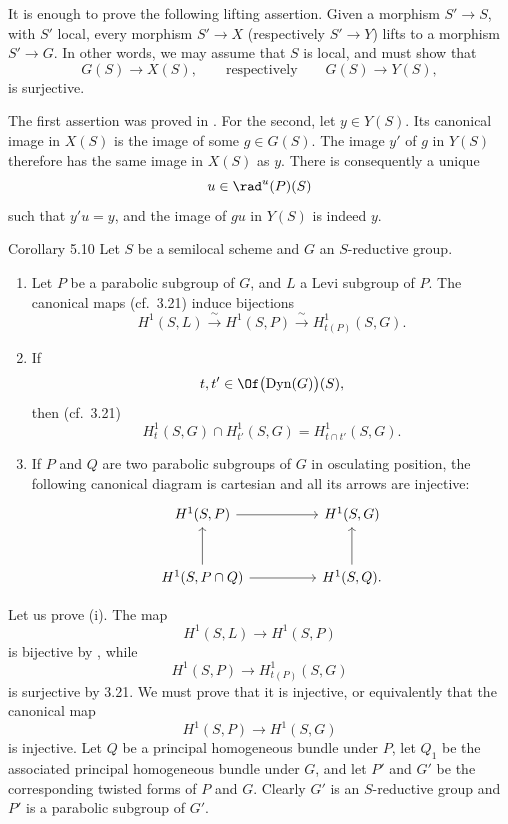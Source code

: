 It is enough to prove the following lifting assertion.  Given a
morphism \(S'\to S\), with \(S'\) local, every morphism \(S'\to X\)
\textup{(respectively \(S'\to Y\))} lifts to a morphism \(S'\to G\).
In other words, we may assume that \(S\) is local, and must show that
\[
 G(S)\longrightarrow X(S),
 \qquad\text{respectively}\qquad
 G(S)\longrightarrow Y(S),
\]
is surjective.

The first assertion was proved in .  For the second, let
\(y\in Y(S)\).  Its canonical image in \(X(S)\) is the image of some
\(g\in G(S)\).  The image \(y'\) of \(g\) in \(Y(S)\) therefore has
the same image in \(X(S)\) as \(y\).  There is consequently a unique
\[
 u\in\rad^u(P)(S)
\]
such that \(y'u=y\), and the image of \(gu\) in \(Y(S)\) is indeed
\(y\).

\begin{sgastatement}{Corollary 5.10}
Let \(S\) be a semilocal scheme and \(G\) an \(S\)-reductive group.
\begin{enumerate}[label=\textup{(\roman*)}]
\item Let \(P\) be a parabolic subgroup of \(G\), and \(L\) a Levi
subgroup of \(P\).  The canonical maps \textup{(cf.\ 3.21)}
induce bijections
\[
 H^1(S,L)\xrightarrow{\ \sim\ }H^1(S,P)
       \xrightarrow{\ \sim\ }H^1_{t(P)}(S,G).
\]
\item If
\[
 t,t'\in\Of\bigl(\operatorname{Dyn}(G)\bigr)(S),
\]
then \textup{(cf.\ 3.21)}
\[
 H^1_t(S,G)\cap H^1_{t'}(S,G)=H^1_{t\cap t'}(S,G).
\]
\item If \(P\) and \(Q\) are two parabolic subgroups of \(G\) in
osculating position, the following canonical diagram is cartesian
and all its arrows are injective:
\[
\begin{tikzcd}[column sep=huge,row sep=large]
 H^1(S,P) \arrow[r] & H^1(S,G)\\
 H^1(S,P\cap Q) \arrow[u] \arrow[r] & H^1(S,Q). \arrow[u]
\end{tikzcd}
\]
\end{enumerate}
\end{sgastatement}

Let us prove \textup{(i)}.  The map
\[
 H^1(S,L)\longrightarrow H^1(S,P)
\]
is bijective by , while
\[
 H^1(S,P)\longrightarrow H^1_{t(P)}(S,G)
\]
is surjective by 3.21.  We must prove that it is injective, or
equivalently that the canonical map
\[
 H^1(S,P)\longrightarrow H^1(S,G)
\]
is injective.  Let \(Q\) be a principal homogeneous bundle under
\(P\), let \(Q_1\) be the associated principal homogeneous bundle
under \(G\), and let \(P'\) and \(G'\) be the corresponding twisted
forms of \(P\) and \(G\).  Clearly \(G'\) is an \(S\)-reductive group
and \(P'\) is a parabolic subgroup of \(G'\).

